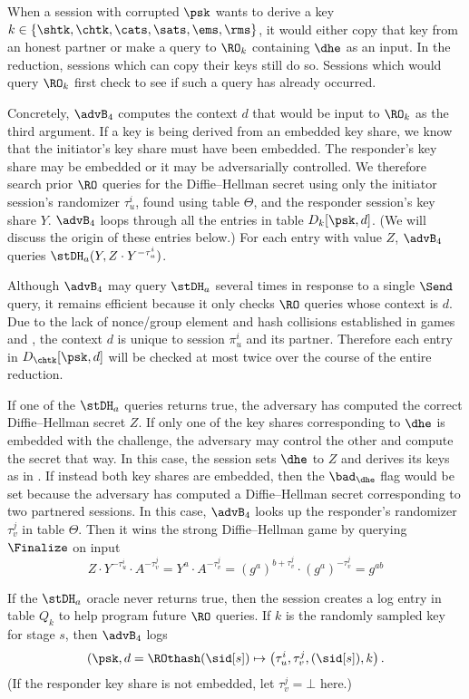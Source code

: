 When a session with corrupted $\psk$ wants to derive a key $k \in \{\shtk, \chtk, \cats, \sats, \ems, \rms\}$, it would either copy that key from an honest partner or make a query to $\RO_k$ containing $\dhe$ as an input.
In the reduction, sessions which can copy their keys still do so.
Sessions which would query $\RO_k$ first check to see if such a query has already occurred.

Concretely, $\advB_4$ computes the context $d$ that would be input to $\RO_k$ as the third argument.
If a key is being derived from an embedded key share, we know that the initiator's key share must have been embedded. 
The responder's key share may be embedded or it may be adversarially controlled. 
We therefore search prior $\RO$ queries for the Diffie--Hellman secret using only the initiator session's randomizer $\tau_u^i$, found using table $\Theta$, and the responder session's key share $Y$.
$\advB_4$ loops through all the entries in table $D_k[\psk, d]$.
(We will discuss the origin of these entries below.)
For each entry with value $Z$, $\advB_4$ queries $\stDH_a(Y, Z \cdot Y^{-\tau_u^i})$.

Although $\advB_4$ may query $\stDH_a$ several times in response to a single $\Send$ query, it remains efficient because it only checks $\RO$ queries whose context is $d$.
Due to the lack of nonce/group element and hash collisions established in games  and , the context $d$ is unique to session $\pi_u^i$ and its partner. 
Therefore each entry in $D_{\chtk}[\psk, d]$ will be checked at most twice over the course of the entire reduction.

If one of the $\stDH_a$ queries returns true, the adversary has computed the correct Diffie--Hellman secret $Z$.
If only one of the key shares corresponding to $\dhe$ is embedded with the challenge, the adversary may control the other and compute the secret that way. 
In this case, the session sets $\dhe$ to $Z$ and derives its keys as in \thisGame. 
If instead both key shares are embedded, then the $\bad_{\dhe}$ flag would be set because the adversary has computed a Diffie--Hellman secret corresponding to two partnered sessions.
In this case, $\advB_4$ looks up the responder's randomizer $\tau_v^j$ in table $\Theta$.
Then it wins the strong Diffie--Hellman game by querying $\Finalize$ on input
\[
Z \cdot Y^{-\tau_u^i} \cdot A^{-\tau_v^j} = Y^a \cdot A^{-\tau_v^j} = (g^a)^{b + \tau_v^j} \cdot (g^a)^{-\tau_v^j} = g^{ab}
\]

If the $\stDH_a$ oracle never returns true, then the session creates a log entry in table $Q_k$ to help program future $\RO$ queries.
If $k$ is the randomly sampled key for stage $s$, then $\advB_4$ logs 
\[
(\psk, d = \ROthash(\sid[s]) \mapsto \left(  \tau_u^i, \tau_v^j, (\sid[s]), k \right).
\]
(If the responder key share is not embedded, let $\tau_v^j = \bot$ here.)

